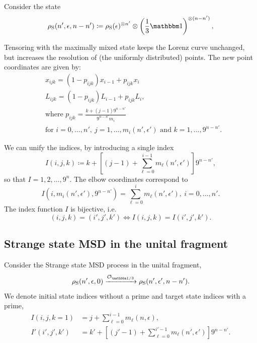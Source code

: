 Consider the state 
\begin{equation*}
\rho_{\rm{S}}(n', \epsilon, n-n') \coloneqq \rho_{\rm{S}}(\epsilon)^{\otimes n'} \otimes \left( \frac{1}{3}\id \right)^{\otimes (n-n')},
\end{equation*}

Tensoring with the maximally mixed state keeps the Lorenz curve unchanged, but increases the resolution of (the uniformly distributed) points.
The new point coordinates are given by:
\begin{align}
    &x_{ijk} = \left( 1-p_{ijk}\right) x_{i-1} + p_{ijk} x_{i} \label{eq:lcsu_xcoord}\\
    &L_{ijk} = \left( 1-p_{ijk} \right) L_{i-1} + p_{ijk} L_{i}, \label{eq:lcsu_lcoord}\\
    &\text{where } p_{ijk} = \frac{k + (j-1)9^{n-n'}}{9^{n-n'} m_{i}} \nonumber\\
    &\text{for } i=0,\dots,n',\ j = 1,\dots,m_{i}(n', \epsilon') \text{ and } k = 1,\dots,9^{n-n'}. \nonumber
\end{align}

We can unify the indices, by introducing a single index
\begin{equation}
    I(i,j,k) \coloneqq k + \left[ (j-1) + \sum_{\ell=0}^{i-1} m_{\ell}(n', \epsilon') \right]9^{n-n'},
\end{equation}
so that $I=1,2,\dots, 9^{n}$.
The elbow coordinates correspond to 
\begin{equation}
	I(i, m_{i}(n', \epsilon'), 9^{n-n'}) = \sum_{\ell=0}^{i} m_{\ell}(n', \epsilon'),\ i= 0,\dots,n'.
\end{equation}
The index function $I$ is bijective, i.e.
\begin{equation}
	(i,j,k) = (i',j',k') \Leftrightarrow I(i,j,k) = I(i',j',k').
\end{equation}

\subsection{Strange state MSD in the unital fragment}\label{app:lc_compare}
Consider the Strange state MSD process in the unital fragment,
\begin{equation}\label{eq:su_conversion}
    \rho_{\rm{S}}(n', \epsilon, 0) \xrightarrow{\mathcal{O}_{\id/3}} \rho_{\rm{S}}(n', \epsilon', n-n').
\end{equation}
We denote initial state indices without a prime and target state indices with a prime,
\begin{align}
    I(i,j,k=1) &= j + \sum_{\ell=0}^{i-1} m_{\ell}(n, \epsilon), \\
    I'(i',j',k') &= k' + \left[ (j'-1) + \sum_{\ell=0}^{i'-1} m_{\ell}(n', \epsilon') \right]9^{n-n'}.
\end{align}

